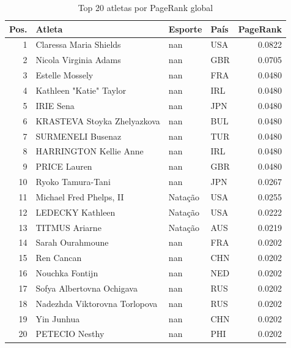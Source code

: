 \begin{table}[htbp]
\caption{Top 20 atletas por PageRank global}
\label{tab:top20_pagerank}
\centering
\footnotesize
\begin{tabular}{rp{6cm}llr}
\toprule
\textbf{Pos.} & \textbf{Atleta} & \textbf{Esporte} & \textbf{País} & \textbf{PageRank} \\
\midrule
1 & Claressa Maria Shields & nan & USA & 0.0822 \\
2 & Nicola Virginia Adams & nan & GBR & 0.0705 \\
3 & Estelle Mossely & nan & FRA & 0.0480 \\
4 & Kathleen "Katie" Taylor & nan & IRL & 0.0480 \\
5 & IRIE Sena & nan & JPN & 0.0480 \\
6 & KRASTEVA Stoyka Zhelyazkova & nan & BUL & 0.0480 \\
7 & SURMENELI Busenaz & nan & TUR & 0.0480 \\
8 & HARRINGTON Kellie Anne & nan & IRL & 0.0480 \\
9 & PRICE Lauren & nan & GBR & 0.0480 \\
10 & Ryoko Tamura-Tani & nan & JPN & 0.0267 \\
11 & Michael Fred Phelps, II & Natação & USA & 0.0255 \\
12 & LEDECKY Kathleen & Natação & USA & 0.0222 \\
13 & TITMUS Ariarne & Natação & AUS & 0.0219 \\
14 & Sarah Ourahmoune & nan & FRA & 0.0202 \\
15 & Ren Cancan & nan & CHN & 0.0202 \\
16 & Nouchka Fontijn & nan & NED & 0.0202 \\
17 & Sofya Albertovna Ochigava & nan & RUS & 0.0202 \\
18 & Nadezhda Viktorovna Torlopova & nan & RUS & 0.0202 \\
19 & Yin Junhua & nan & CHN & 0.0202 \\
20 & PETECIO Nesthy & nan & PHI & 0.0202 \\
\bottomrule
\end{tabular}
\end{table}
